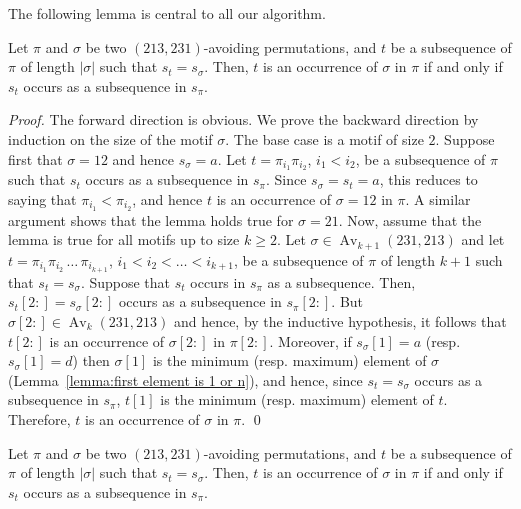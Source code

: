 \documentclass[a4paper]{llncs}
\DeclareMathOperator{\Avd}{Av}
\newcommand\Av[2]{\Avd_{{#1}}({#2})}
\begin{document}
The following lemma is central to all our algorithm.

\begin{lemma}
\label{lemma:MatchStripeToPermutation}
Let $\pi$ and $\sigma$ be two $(213,231)$-avoiding permutations,
and $t$ be a subsequence of $\pi$ of length $|\sigma|$ such that $s_t = s_\sigma$.
Then, $t$ is an occurrence of $\sigma$ in $\pi$ if and only if
$s_t$ occurs as a subsequence in $s_\pi$.
\end{lemma}

\begin{proof}
  The forward direction is obvious.
  We prove the backward direction by induction on the size of the motif
  $\sigma$.
  The base case is a motif of size $2$.
  Suppose first that $\sigma = 12$ and hence $s_\sigma = a$.
  Let $t = \pi_{i_1}\pi_{i_2}$, $i_1 < i_2$, be a subsequence of $\pi$
  such that $s_t$ occurs as a subsequence in $s_\pi$.
  Since $s_\sigma = s_t = a$, this reduces to saying that
  $\pi_{i_1} < \pi_{i_2}$, and hence $t$ is an occurrence of $\sigma = 12$ in $\pi$.
  A similar argument shows that the lemma holds true for $\sigma = 21$.
  Now, assume that the lemma is true for all motifs up to size $k \geq 2$.
  Let $\sigma \in \Av{k+1}{231,213}$ and
  let $t = \pi_{i_1}\pi_{i_2}\,\ldots\,\pi_{i_{k+1}}$,
  $i_1 < i_2 < \ldots < i_{k+1}$,
  be a subsequence of $\pi$ of length $k+1$ such that
  $s_t = s_\sigma$.
  Suppose that $s_t$ occurs in $s_\pi$ as a subsequence.
  Then, $s_t[2:] = s_\sigma[2:]$ occurs as a subsequence in $s_\pi[2:]$.
  But $\sigma[2:] \in \Av{k}{231,213}$ and hence,
  by the inductive hypothesis, it follows that
  $t[2:]$ is an occurrence of $\sigma[2:]$ in $\pi[2:]$.
  Moreover, if $s_\sigma[1] = a$ (resp. $s_\sigma[1] = d$)
  then $\sigma[1]$ is the minimum (resp. maximum) element of $\sigma$
  (Lemma~\ref{lemma:first element is 1 or n}),
  and hence, since $s_t = s_\sigma$ occurs as a subsequence in $s_\pi$,
  $t[1]$ is the minimum (resp. maximum) element of $t$.
  Therefore, $t$ is an occurrence of $\sigma$ in $\pi$.
\qed
\end{proof}

\begin{lemma}
\label{lemma:MatchStripeToPermutation}
Let $\pi$ and $\sigma$ be two $(213,231)$-avoiding permutations,
and $t$ be a subsequence of $\pi$ of length $|\sigma|$ such that $s_t = s_\sigma$.
Then, $t$ is an occurrence of $\sigma$ in $\pi$ if and only if
$s_t$ occurs as a subsequence in $s_\pi$.
\end{lemma}
\end{document}
